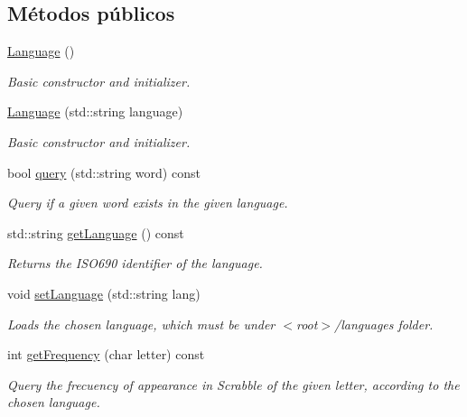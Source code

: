 \subsection*{Métodos públicos}
\begin{DoxyCompactItemize}
\item 
\mbox{\label{classLanguage_a09448361f9188bceaaeebc5576cd6896}} 
\hyperlink{classLanguage_a09448361f9188bceaaeebc5576cd6896}{Language} ()
\begin{DoxyCompactList}\small\item\em Basic constructor and initializer. \end{DoxyCompactList}\item 
\hyperlink{classLanguage_ad7c92d28e44058ef4c7ea1b413a4b269}{Language} (std\+::string language)
\begin{DoxyCompactList}\small\item\em Basic constructor and initializer. \end{DoxyCompactList}\item 
bool \hyperlink{classLanguage_a54e61d6c3ff6ec45c43e8d577fd91d41}{query} (std\+::string word) const
\begin{DoxyCompactList}\small\item\em Query if a given word exists in the given language. \end{DoxyCompactList}\item 
std\+::string \hyperlink{classLanguage_ae601aeb3adba71b80ca3eb25310bed58}{get\+Language} () const
\begin{DoxyCompactList}\small\item\em Returns the I\+S\+O690 identifier of the language. \end{DoxyCompactList}\item 
void \hyperlink{classLanguage_accc1c22d8bba3002a71bea06cecf624b}{set\+Language} (std\+::string lang)
\begin{DoxyCompactList}\small\item\em Loads the chosen language, which must be under $<$root$>$/languages folder. \end{DoxyCompactList}\item 
int \hyperlink{classLanguage_ac727ac60a054ecd36e526fe93de8fc7f}{get\+Frequency} (char letter) const
\begin{DoxyCompactList}\small\item\em Query the frecuency of appearance in Scrabble of the given letter, according to the chosen language. \end{DoxyCompactList}\item 

\end{DoxyCompactItemize}

